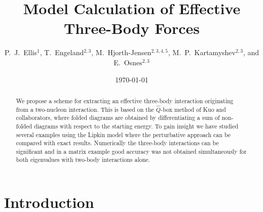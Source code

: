 \documentclass[prc,aps,amsmath,amssymb,preprintnumbers,showpacs,twocolumn]{revtex4}
\begin{document}
\title{Model Calculation of Effective Three-Body Forces}
\author{P.~J.~Ellis$^1$, T.~Engeland$^{2,3}$, M.~Hjorth-Jensen$^{2,3,4,5}$, 
M.~P.~Kartamyshev$^{2,3}$, and E.~Osnes$^{2,3}$} 



\date{\today}

\begin{abstract}
We propose a scheme for extracting an effective three-body interaction 
originating from a two-nucleon interaction. This is based on the 
$\hat{Q}$-box method of Kuo and collaborators, where folded diagrams 
are obtained by differentiating a sum of non-folded diagrams with respect 
to the starting energy. To gain insight we have studied several examples
using the Lipkin model where the perturbative approach can be compared with
exact results. Numerically the three-body interactions can be significant 
and in a matrix example good accuracy was not obtained simultaneously for 
both eigenvalues with two-body interactions alone.
\end{abstract}
\maketitle


\section{Introduction}
\end{document}
